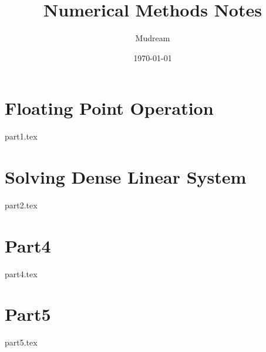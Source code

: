 \documentclass{article}
\title{Numerical Methods Notes}
\author{Mudream}
\date{\today}
\begin{document}
    \maketitle
    \part{Floating Point Operation}
    {part1.tex}
    \part{Solving Dense Linear System}
    {part2.tex}
    \part{Part4}
    {part4.tex}
    \part{Part5}
    {part5.tex}
\end{document}

